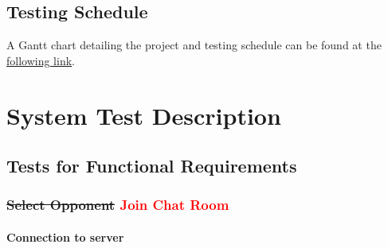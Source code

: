 \documentclass[12pt, titlepage]{article}
\begin{document}
\subsection{Testing Schedule}
		
A Gantt chart detailing the project and testing schedule can be found at the \href{https://gitlab.cas.mcmaster.ca/celsj/3xa3-group2-chess/-/blob/master/ProjectSchedule/3XA3_ProjectSchedule.pdf}{following link}. 

\section{System Test Description}
	
\subsection{Tests for Functional Requirements}

\subsubsection{\sout{Select Opponent} \textcolor{red}{Join Chat Room}}
		
    \paragraph{Connection to server}
    
\end{document}

